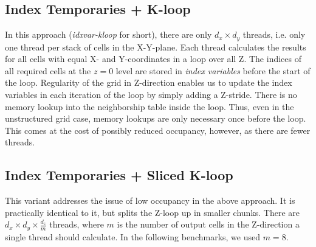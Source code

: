 
\subsection{Index Temporaries + K-loop} In this approach (\emph{idxvar-kloop} for short), there are only $d_x\times d_y$ threads, i.e. only one thread per stack of cells in the X-Y-plane. Each thread calculates the results for all cells with equal X- and Y-coordinates in a loop over all Z. The indices of all required cells at the $z=0$ level are stored in \emph{index variables} before the start of the loop. Regularity of the grid in Z-direction enables us to update the index variables in each iteration of the loop by simply adding a Z-stride. There is no memory lookup into the neighborship table inside the loop. Thus, even in the unstructured grid case, memory lookups are only necessary once before the loop. This comes at the cost of possibly reduced occupancy, however, as there are fewer threads.

\subsection{Index Temporaries + Sliced K-loop} This variant addresses the issue of low occupancy in the above approach. It is practically identical to it, but splits the Z-loop up in smaller chunks. There are $d_x\times d_y\times \frac{d_z}{m}$ threads, where $m$ is the number of output cells in the Z-direction a single thread should calculate. In the following benchmarks, we used $m=8$.


